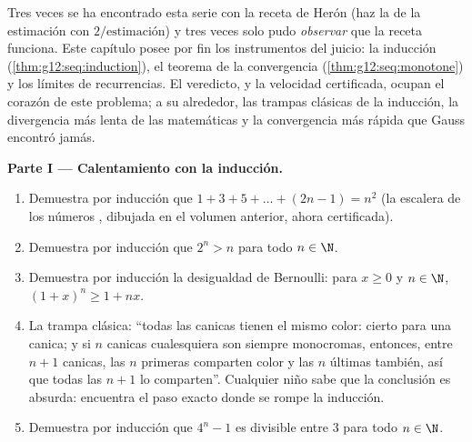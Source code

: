 \begin{problem}
\label{pb:g12:seq:1}
Tres veces se ha encontrado esta serie con la receta de Herón (haz la 
de la estimación con $2/\text{estimación}$) y tres veces solo pudo
\emph{observar} que la receta funciona. Este capítulo posee por fin los
instrumentos del juicio: la inducción (\cref{thm:g12:seq:induction}), el
teorema de la convergencia  (\cref{thm:g12:seq:monotone}) y los
límites de recurrencias. El veredicto, y la velocidad certificada, ocupan
el corazón de este problema; a su alrededor, las trampas clásicas de la
inducción, la divergencia más lenta de las matemáticas y la convergencia
más rápida que Gauss encontró jamás.

\medskip
\noindent\textbf{Parte I --- Calentamiento con la inducción.}
\begin{enumerate}
  \item Demuestra por inducción que
        $1 + 3 + 5 + \dots + (2n - 1) = n^2$ (la escalera de los números
        , dibujada en el volumen anterior, ahora certificada).
  \item Demuestra por inducción que $2^n > n$ para todo $n \in \N$.
  \item Demuestra por inducción la desigualdad de Bernoulli: para
        $x \geq 0$ y $n \in \N$, $(1 + x)^n \geq 1 + nx$.
  \item La trampa clásica: ``todas las canicas tienen el mismo color:
        cierto para una canica; y si $n$ canicas cualesquiera son siempre
        monocromas, entonces, entre $n + 1$ canicas, las $n$ primeras
        comparten color y las $n$ últimas también, así que todas las
        $n + 1$ lo comparten''. Cualquier niño sabe que la conclusión es
        absurda: encuentra el paso exacto donde se rompe la inducción.
  \item Demuestra por inducción que $4^n - 1$ es divisible entre $3$ para
        todo $n \in \N$.
\end{enumerate}


\end{problem}
